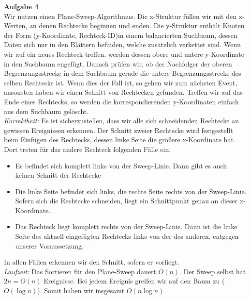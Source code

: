 \documentclass{article}
\begin{document}
\textbf{Aufgabe 4}\\
Wir nutzen einen Plane-Sweep-Algorithmus. Die x-Struktur f\"ullen wir mit den x-Werten, an denen Rechtecke beginnen und enden. Die y-Struktur enth\"alt Knoten der Form (y-Koordinate, Rechteck-ID)in einem balancierten Suchbaum, dessen Daten sich nur in den Bl\"attern befinden, welche zus\"atzlich verkettet sind. Wenn wir auf ein neues Rechteck treffen, werden dessen obere und untere y-Koordinate in den Suchbaum engef\"ugt. Danach pr\"ufen wir, ob der Nachfolger der oberen Begrenzungsstrecke in dem Suchbaum gerade die untere Begrenzungsstrecke des selben Rechtecks ist. Wenn dies der Fall ist, so gehen wir zum n\"achsten Event, ansonsten haben wir einen Schnitt von Rechtecken gefunden. Treffen wir auf das Ende eines Rechtecks, so werden die korrespondierenden y-Koordinaten einfach aus dem Suchbaum gel\"oscht.\\
\textit{Korrektheit:} Es ist sicherzustellen, dass wir alle sich schneidenden Rechtecke an gewissen Ereignissen erkennen. Der Schnitt zweier Rechtecke wird festgestellt beim Einf\"ugen des Rechtecks, dessen linke Seite die gr\"o\ss ere x-Koordinate hat. Dort treten f\"ur das andere Rechteck folgenden F\"alle ein:
\begin{itemize}
\item Es befindet sich komplett links von der Sweep-Linie. Dann gibt es auch keinen Schnitt der Rechtecke
\item Die linke Seite befindet sich links, die rechte Seite rechts von der Sweep-Linie. Sofern sich die Rechtecke schneiden, liegt ein Schnittpunkt genau an dieser x-Koordinate.
\item Das Rechteck liegt komplett rechts von der Sweep-Linie. Dann ist die linke Seite des aktuell eingef\"ugten Rechtecks links von der des anderen, entgegen unserer Voraussetzung.
\end{itemize}
In allen F\"allen erkennen wir den Schnitt, sofern er vorliegt.\\
\textit{Laufzeit:} Das Sortieren f\"ur den Plane-Sweep dauert $O(n)$. Der Sweep selbst hat $2n = O(n)$ Ereignisse. Bei jedem Ereignis greifen wir auf den Baum zu ($O(\log n)$). Somit haben wir insgesamt $O(n\log n)$.
\end{document}
